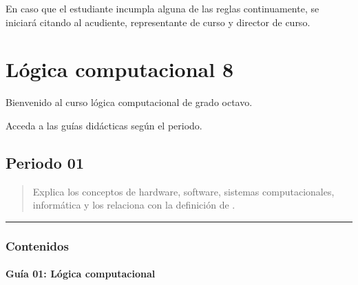 \documentclass[letterpaper,10pt,spanish]{sphinxmanual}
\begin{document}
\sphinxAtStartPar
En caso que el estudiante incumpla alguna de las reglas continuamente, se iniciará  citando al acudiente, representante de curso y director de curso.

\sphinxstepscope


\chapter{Lógica computacional 8}
\label{\detokenize{cursos/logica8/index:logica-computacional-8}}\label{\detokenize{cursos/logica8/index::doc}}
\sphinxAtStartPar
Bienvenido al curso lógica computacional de grado octavo.

\sphinxAtStartPar
Acceda a las guías didácticas según el periodo.

\sphinxstepscope


\section{Periodo 01}
\label{\detokenize{cursos/logica8/periodo01/index:periodo-01}}\label{\detokenize{cursos/logica8/periodo01/index::doc}}\begin{quote}\begin{description}
\sphinxAtStartPar
Explica los conceptos de hardware, software, sistemas computacionales, informática y los relaciona con la definición de .

\end{description}\end{quote}


\bigskip\hrule\bigskip



\subsection{Contenidos}
\label{\detokenize{cursos/logica8/periodo01/index:contenidos}}
\sphinxstepscope


\subsubsection{Guía 01: Lógica computacional}
\label{\detokenize{cursos/logica8/periodo01/G01:guia-01-logica-computacional}}\label{\detokenize{cursos/logica8/periodo01/G01::doc}}
\end{document}
